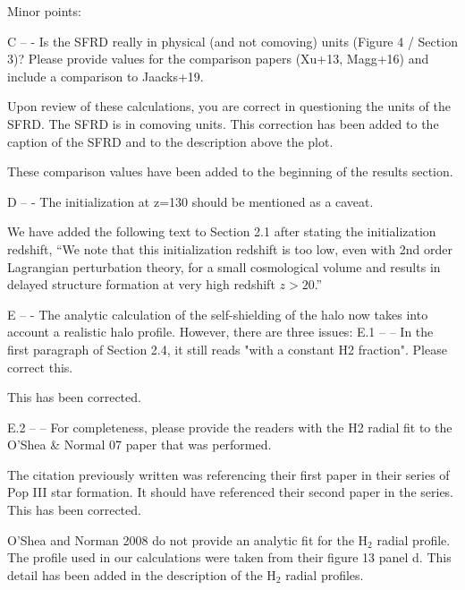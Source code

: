 \documentclass[11pt]{article}
\newenvironment{referee}[1][]{%
    \ignorespaces%
    \begin{mdframed}[style=myquotestyle,#1]%
}{%
    \end{mdframed}%
    \ignorespacesafterend%
}%
\begin{document}
\begin{referee}
    Minor points: 

    C -- - Is the SFRD really in physical (and not comoving) units (Figure 4 / Section 3)? Please provide values for the comparison papers (Xu+13, Magg+16) and include a comparison to Jaacks+19. 
\end{referee}

    Upon review of these calculations, you are correct in questioning the units of the SFRD. The SFRD is in comoving units. This correction has been added to the caption of the SFRD and to the description above the plot. 

    These comparison values have been added to the beginning of the results section.

\begin{referee}
    D -- - The initialization at z=130 should be mentioned as a caveat. 
\end{referee}
We have added the following text to Section 2.1 after stating the initialization redshift, ``We note that this initialization redshift is too low, even with 2nd order Lagrangian perturbation theory, for a small cosmological volume and results in delayed structure formation at very high redshift $z > 20$.''    


\begin{referee}
    E -- - The analytic calculation of the self-shielding of the halo now takes into account a realistic halo profile. However, there are three issues: 
    E.1 -- -- In the first paragraph of Section 2.4, it still reads "with a constant H2 fraction". Please correct this. 
\end{referee}
    This has been corrected.

\begin{referee}
    E.2 -- -- For completeness, please provide the readers with the H2 radial fit to the O'Shea \& Normal 07 paper that was performed. 
\end{referee}
    The citation previously written was referencing their first paper in their series of Pop III star formation. It should have referenced their second paper in the series. This has been corrected.
    
    O'Shea and Norman 2008 do not provide an analytic fit for the H$_2$ radial profile. The profile used in our calculations were taken from their figure 13 panel d. This detail has been added in the description of the H$_2$ radial profiles.

\end{document}

